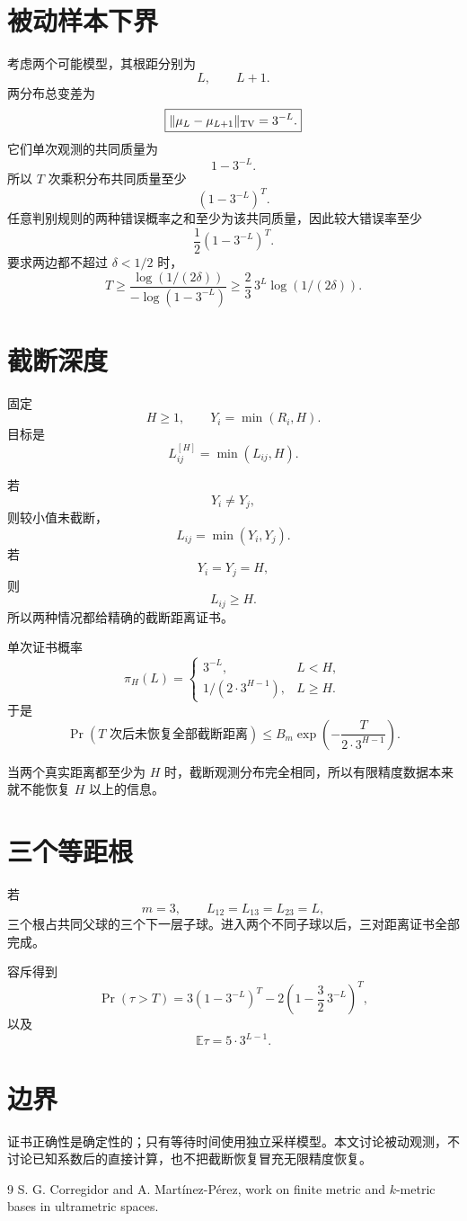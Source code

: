 \documentclass[11pt,a4paper]{ctexart}
\begin{document}
\section{被动样本下界}
考虑两个可能模型，其根距分别为
\[
L,\qquad L+1.
\]
两分布总变差为
\[
\boxed{
\|\mu_L-\mu_{L+1}\|_{\rm TV}=3^{-L}.
}
\]
它们单次观测的共同质量为
\[
1-3^{-L}.
\]
所以 \(T\) 次乘积分布共同质量至少
\[
(1-3^{-L})^T.
\]
任意判别规则的两种错误概率之和至少为该共同质量，因此较大错误率至少
\[
\boxed{
\frac12(1-3^{-L})^T.
}
\]
要求两边都不超过 \(\delta<1/2\) 时，
\[
\boxed{
T
\ge
\frac{\log(1/(2\delta))}
{-\log(1-3^{-L})}
\ge
\frac23\,3^L\log(1/(2\delta)).
}
\]

\section{截断深度}
固定
\[
H\ge1,\qquad
Y_i=\min(R_i,H).
\]
目标是
\[
L^{[H]}_{ij}=\min(L_{ij},H).
\]

若
\[
Y_i\ne Y_j,
\]
则较小值未截断，
\[
L_{ij}=\min(Y_i,Y_j).
\]
若
\[
Y_i=Y_j=H,
\]
则
\[
L_{ij}\ge H.
\]
所以两种情况都给精确的截断距离证书。

单次证书概率
\[
\boxed{
\pi_H(L)=
\begin{cases}
3^{-L},&L<H,\\
1/(2\cdot3^{H-1}),&L\ge H.
\end{cases}
}
\]
于是
\[
\boxed{
\Pr(\text{\(T\) 次后未恢复全部截断距离})
\le
B_m\exp\!\left(-\frac{T}{2\cdot3^{H-1}}\right).
}
\]

当两个真实距离都至少为 \(H\) 时，截断观测分布完全相同，所以有限精度数据本来就不能恢复 \(H\) 以上的信息。

\section{三个等距根}
若
\[
m=3,\qquad
L_{12}=L_{13}=L_{23}=L,
\]
三个根占共同父球的三个下一层子球。进入两个不同子球以后，三对距离证书全部完成。

容斥得到
\[
\boxed{
\Pr(\tau>T)
=
3(1-3^{-L})^T
-
2\left(1-\frac32\,3^{-L}\right)^T,
}
\]
以及
\[
\boxed{
\mathbb E\tau
=
5\cdot3^{L-1}.
}
\]

\section{边界}
证书正确性是确定性的；只有等待时间使用独立采样模型。本文讨论被动观测，不讨论已知系数后的直接计算，也不把截断恢复冒充无限精度恢复。

\begin{thebibliography}{9}
 S. G. Corregidor and A. Martínez-Pérez, work on finite metric and \(k\)-metric bases in ultrametric spaces.
\end{thebibliography}
\end{document}
